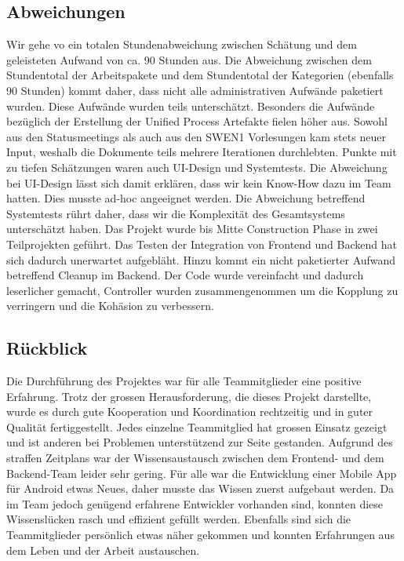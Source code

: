 \subsection{Abweichungen}\label{abweichungen}
Wir gehe vo ein totalen Stundenabweichung zwischen Schätung und dem geleisteten Aufwand von ca. 90 Stunden aus. 
Die Abweichung zwischen dem Stundentotal der Arbeitspakete und dem Stundentotal der Kategorien
(ebenfalls 90 Stunden) kommt daher, dass nicht alle administrativen Aufwände paketiert wurden. Diese Aufwände wurden
teils unterschätzt.
Besonders die Aufwände bezüglich der Erstellung der Unified Process Artefakte fielen höher aus.
Sowohl aus den Statusmeetings als auch aus den SWEN1 Vorlesungen kam stets neuer Input, weshalb
die Dokumente teils mehrere Iterationen durchlebten.
Punkte mit zu tiefen Schätzungen waren auch UI-Design und Systemtests. Die Abweichung bei UI-Design
lässt sich damit erklären, dass wir kein Know-How dazu im Team hatten. Dies musste ad-hoc angeeignet
werden. Die Abweichung betreffend Systemtests rührt daher, dass wir die Komplexität des Gesamtsystems
unterschätzt haben. Das Projekt wurde bis Mitte Construction Phase in zwei Teilprojekten geführt. Das
Testen der Integration von Frontend und Backend hat sich dadurch unerwartet aufgebläht.
Hinzu kommt ein nicht paketierter Aufwand betreffend Cleanup im Backend. Der Code wurde vereinfacht und
dadurch leserlicher gemacht, Controller wurden zusammengenommen um die Kopplung zu verringern und die
Kohäsion zu verbessern.

\subsection{Rückblick}\label{rueckblick}
Die Durchführung des Projektes war für alle Teammitglieder eine positive Erfahrung. Trotz der grossen
Herausforderung, die dieses Projekt darstellte, wurde es durch gute Kooperation und Koordination
rechtzeitig und in guter Qualität fertiggestellt.
Jedes einzelne Teammitglied hat grossen Einsatz gezeigt und ist anderen bei Problemen unterstützend
zur Seite gestanden. Aufgrund des straffen Zeitplans war der Wissensaustausch zwischen dem Frontend-
und dem Backend-Team leider sehr gering.
Für alle war die Entwicklung einer Mobile App für Android etwas Neues, daher musste das Wissen zuerst
aufgebaut werden. Da im Team jedoch genügend erfahrene Entwickler vorhanden sind, konnten diese
Wissenslücken rasch und effizient gefüllt werden. Ebenfalls sind sich die Teammitglieder persönlich
etwas näher gekommen und konnten Erfahrungen aus dem Leben und der Arbeit austauschen.

